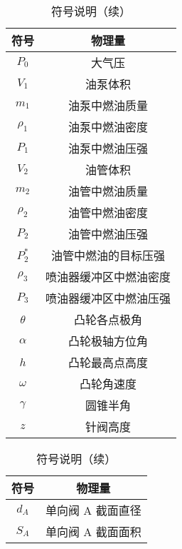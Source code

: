 \documentclass[withoutpreface,bwprint]{cumcmthesis}
\begin{document}
\begin{table}[!ht]
    \begin{minipage}{\textwidth}
        \begin{minipage}[t]{0.5\textwidth}
        \centering
        \caption{符号说明}
        \begin{tabular}{cc}
        \toprule
        符号             & 物理量           \\
		\midrule
		$P_0$          & 大气压            \\
        $V_1$          & 油泵体积          \\
		$m_1$          & 油泵中燃油质量     \\
		$\rho_1$       & 油泵中燃油密度       \\
        $P_1$          & 油泵中燃油压强          \\
        $V_2$          & 油管体积          \\
		$m_2$          & 油管中燃油质量     \\
        $\rho_2$       & 油管中燃油密度       \\
        $P_2$          & 油管中燃油压强          \\
		$P_2^*$        & 油管中燃油的目标压强     \\
		$\rho_3$       & 喷油器缓冲区中燃油密度   \\
		$P_3$          & 喷油器缓冲区中燃油压强   \\
        $\theta$       & 凸轮各点极角        \\
        $\alpha$       & 凸轮极轴方位角       \\
        $h$            & 凸轮最高点高度       \\
        $\omega$       & 凸轮角速度         \\
        $\gamma$       & 圆锥半角          \\
		$z$            & 针阀高度          \\ 
		\bottomrule
        \end{tabular}
        \end{minipage}
        \begin{minipage}[t]{0.5\textwidth}
        \centering
        \caption{符号说明（续）}
        \begin{tabular}{cc}
        \toprule
        符号             & 物理量           \\
        \midrule
        $d_A$          & 单向阀 A 截面直径       \\
        $S_A$          & 单向阀 A 截面面积       \\

\end{tabular}
\end{minipage}
\end{minipage}
\end{table}
\end{document}
